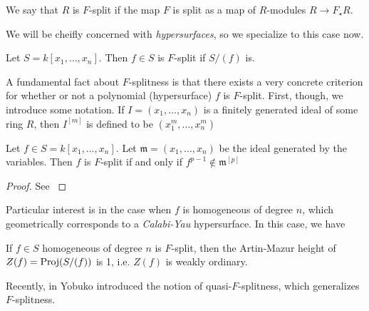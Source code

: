 \begin{defn}
	We say that \(R\) is \(F\)-split if the map \(F\) is
	split as a map of 
	\(R\)-modules \(R \xrightarrow{} F_{\star}R\).
\end{defn}

We will be cheifly concerned with \textit{hypersurfaces},
so we specialize to this case now.

\begin{defn}
	Let \(S = k[x_{1}, \ldots, x_{n}]\).
	Then \(f \in S\) is \(F\)-split if 
	\(S / (f)\) is.
\end{defn}

A fundamental fact about \(F\)-splitness is that there
exists a very concrete criterion for whether or 
not a polynomial (hypersurface) \(f\) is \(F\)-split.
First, though, we introduce some notation.
If \(I = (x_{1}, \ldots, x_{n})\) is a finitely generated 
ideal of some ring \(R\), 
then \(I^{[m]}\)
is defined to be \((x_{1}^{m}, \ldots, x_{n}^{m})\)

\begin{thm}
	Let \(f \in S = k[x_{1}, \ldots, x_{n}]\).
	Let \(\mathfrak{m} = (x_{1}, \ldots, x_{n})\) 
	be the ideal generated by the variables.
	Then \(f\) is \(F\)-split if and only if 
	\(f^{p-1} \notin \mathfrak{m}^{[p]}\)
\end{thm}

\begin{proof}
	See \cite[Theorem~2.5]{ma-polstra-2021-F-sing-comm-alg}
\end{proof}


Particular interest is in the case when \(f\) is 
homogeneous of degree \(n\), which geometrically
corresponds to a \textit{Calabi-Yau} hypersurface.
In this case, we have

\begin{thm}
	\label{thm:fsplit:ordinary}
	If \(f \in S\) 
	homogeneous of degree \(n\) 
	is \(F\)-split,
	then the Artin-Mazur height 
	of \(Z(f) = \operatorname{Proj} (S / (f))\) 
	is 1, i.e. \(Z(f)\) is weakly ordinary.
\end{thm}

Recently, in \cite{yobuko-2019-qfs-calabi-yau}
Yobuko introduced the notion of 
quasi-\(F\)-splitness, which generalizes \(F\)-splitness.

